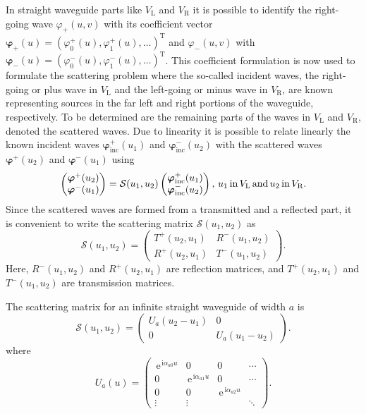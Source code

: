 \documentclass{svjour3}
\renewcommand{\phi}{\varphi}
\renewcommand{\vec}[1]{\bm{#1}}
\renewcommand{\i}{\,\mathrm{i}}
\newcommand{\e}{\,\mathrm{e}}
\begin{document}
In straight waveguide parts like $V_{\text{L}}$ and $V_{\text{R}}$ it
is possible to identify the right-going wave $ \phi_{+}(u,v)$ with its
coefficient vector $
\bm{\phi}_{+}(u)=(\phi_{0}^{+}(u),\phi_{1}^{+}(u),\ldots)^{\text{T}}$
and $ \phi_{-}(u,v)$ with $
\bm{\phi}_{-}(u)=(\phi_{0}^{-}(u),\phi_{1}^{-}(u),\ldots)^{\text{T}}$. This
coefficient formulation is now used to formulate the scattering
problem where the so-called incident waves, the right-going or plus
wave in $V_{\text{L}}$ and the left-going or minus wave in
$V_{\text{R}}$, are known representing sources in the far left and
right portions of the waveguide, respectively. To be determined are
the remaining parts of the waves in $V_{\text{L}}$ and $V_{\text{R}}$,
denoted the scattered waves. Due to linearity it is possible to relate
linearly the known incident waves $\bm{\phi}_{\text{inc}}^{+}(u_1)$
and $\bm{\phi}_{\text{inc}}^{-}(u_2)$ with the scattered waves
$\bm{\phi}^{+}(u_2)$ and $\bm{\phi}^{-}(u_1)$ using
\begin{equation}
  \label{107}
  \begin{pmatrix}
    \vec \phi^+(u_2)\\
    \vec \phi^-(u_1)
  \end{pmatrix}= \mathcal{S}(u_1,u_2)
  \begin{pmatrix}
    \vec \phi_{\text{inc}}^+(u_1)\\
    \vec \phi_{\text{inc}}^-(u_2)
  \end{pmatrix},\, u_1\, {\rm in}\, V_{\rm L}\, {\rm and}\, u_2\, {\rm
    in}\, V_{\rm R}.
\end{equation}
Since the scattered waves are formed from a transmitted and a
reflected part, it is convenient to write the scattering matrix $
\mathcal{S}(u_1,u_2)$ as
\begin{equation}
  \label{108}
  \mathcal{S}(u_1,u_2)=
  \begin{pmatrix}
    T^+(u_2,u_1)& R^-(u_1,u_2)\\
    R^+(u_2,u_1)& T^-(u_1,u_2)
  \end{pmatrix}
  .
\end{equation}
Here, $R^-(u_1,u_2)$ and $R^+(u_2,u_1)$ are reflection matrices, and
$T^+(u_2,u_1)$ and $T^-(u_1,u_2)$ are transmission matrices.

The scattering matrix for an infinite straight waveguide of width $a$
is
\begin{equation}
  \label{109}
  \mathcal{S}(u_1,u_2)=
  \begin{pmatrix}
    U_a(u_2-u_1)&0\\
    0&U_a(u_1-u_2)
  \end{pmatrix}
  .
\end{equation}
where
\begin{equation}
  \label{eq:S}
  U_a(u)=
  \begin{pmatrix}
    \e^{\i\alpha_{a0}u}&0&0&\cdots\\
    0&\e^{\i\alpha_{a1}u}&0&\cdots\\
    0&0&\e^{\i\alpha_{a2}u}&\\
    \vdots&\vdots&&\ddots
  \end{pmatrix}.
\end{equation}
\end{document}
